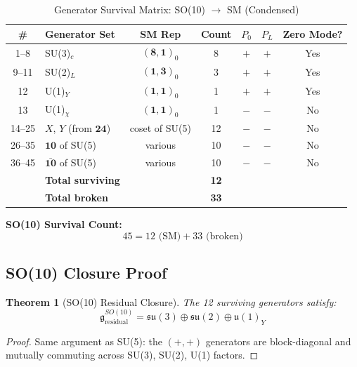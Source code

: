 \documentclass[11pt,a4paper]{article}
\newtheorem{theorem}{Theorem}[section]
\begin{document}
\begin{table}[ht]
\centering
\caption{Generator Survival Matrix: SO(10) $\to$ SM (Condensed)}
\label{tab:so10-survival}
\small
\begin{tabular}{clccccc}
\toprule
\# & Generator Set & SM Rep & Count & $P_0$ & $P_L$ & Zero Mode? \\
\midrule
1--8 & SU(3)$_c$ & $(\mathbf{8},\mathbf{1})_0$ & 8 & $+$ & $+$ & Yes \\
9--11 & SU(2)$_L$ & $(\mathbf{1},\mathbf{3})_0$ & 3 & $+$ & $+$ & Yes \\
12 & U(1)$_Y$ & $(\mathbf{1},\mathbf{1})_0$ & 1 & $+$ & $+$ & Yes \\
13 & U(1)$_\chi$ & $(\mathbf{1},\mathbf{1})_0$ & 1 & $-$ & $-$ & No \\
14--25 & $X$, $Y$ (from $\mathbf{24}$) & coset of SU(5) & 12 & $-$ & $-$ & No \\
26--35 & $\mathbf{10}$ of SU(5) & various & 10 & $-$ & $-$ & No \\
36--45 & $\bar{\mathbf{10}}$ of SU(5) & various & 10 & $-$ & $-$ & No \\
\midrule
& \textbf{Total surviving} & & \textbf{12} & & & \\
& \textbf{Total broken} & & \textbf{33} & & & \\
\bottomrule
\end{tabular}
\end{table}

\begin{resultbox}
\textbf{SO(10) Survival Count:}
\begin{equation}
  45 = 12 \text{ (SM)} + 33 \text{ (broken)}
  \label{eq:so10-survival-count}
\end{equation}
\end{resultbox}

\subsection{SO(10) Closure Proof}

\begin{theorem}[SO(10) Residual Closure]
\label{thm:so10-closure}
The 12 surviving generators satisfy:
\begin{equation}
  \mathfrak{g}_{\text{residual}}^{SO(10)} = \mathfrak{su}(3) \oplus \mathfrak{su}(2)
    \oplus \mathfrak{u}(1)_Y
  \label{eq:so10-residual}
\end{equation}
\end{theorem}

\begin{proof}
Same argument as SU(5): the $(+,+)$ generators are block-diagonal and mutually
commuting across SU(3), SU(2), U(1) factors.
\end{proof}
\end{document}
